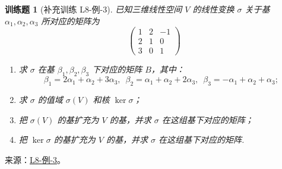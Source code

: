 \documentclass[UTF8,12pt,a4paper,fontset=fandol]{ctexart}
\newtheorem{exercise}{训练题}[section]
\begin{document}
\begin{exercise}[补充训练 L8-例-3]\label{prob:L8-例-3}
已知三维线性空间 $V$ 的线性变换 $\sigma$ 关于基 $\alpha_1,\alpha_2,\alpha_3$ 所对应的矩阵为
    \[\begin{pmatrix}1 & 2 & -1 \\ 2 & 1 & 0 \\ 3 & 0 & 1\end{pmatrix}\]
    \begin{enumerate}
        \item 求 $\sigma$ 在基 $\beta_1,\beta_2,\beta_3$ 下对应的矩阵 $B$，其中：
              \[\beta_1=2\alpha_1+\alpha_2+3\alpha_3,\enspace \beta_2=\alpha_1+\alpha_2+2\alpha_3,\enspace \beta_3=-\alpha_1+\alpha_2+\alpha_3;\]

        \item 求 $\sigma$ 的值域 $\sigma(V)$ 和核 $\ker\sigma$；

        \item 把 $\sigma(V)$ 的基扩充为 $V$ 的基，并求 $\sigma$ 在这组基下对应的矩阵；

        \item 把 $\ker\sigma$ 的基扩充为 $V$ 的基，并求 $\sigma$ 在这组基下对应的矩阵.
    \end{enumerate}
\end{exercise}
\noindent 来源：\href{https://github.com/yhwu-is/Linear-Algebra-Left-Undone/blob/new/%E8%AE%B2%E4%B9%89/%E4%B8%93%E9%A2%98/8%20%E7%9B%B8%E6%8A%B5%E6%A0%87%E5%87%86%E5%BD%A2.tex}{L8-例-3}。
\end{document}
